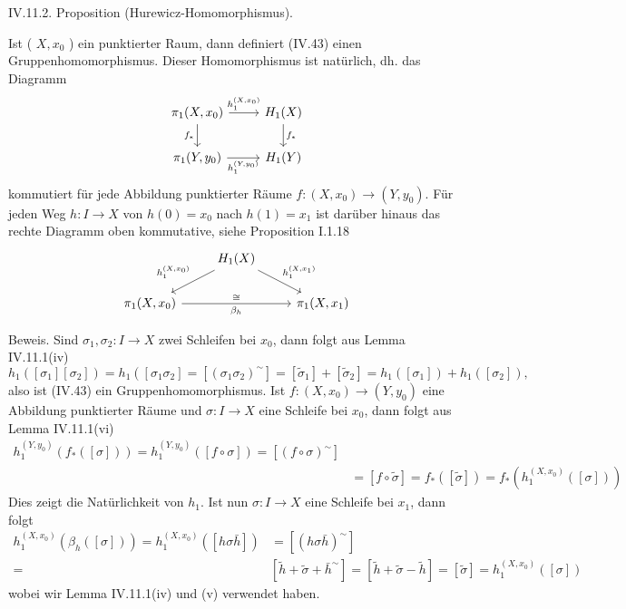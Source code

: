 \documentclass[10pt, letterpaper]{article}
\begin{document}
IV.11.2. Proposition (Hurewicz-Homomorphismus). 

Ist ( $X, x_0$ ) ein punktierter Raum, dann definiert (IV.43) einen Gruppenhomomorphismus. Dieser Homomorphismus ist natürlich, dh. das Diagramm
\[
\begin{tikzcd}
\pi_1(X, x_0) \arrow[r, "h_1^{(X,x_0)}"] \arrow[d, "f_*"'] & H_1(X) \arrow[d, "f_*"] \\
\pi_1(Y, y_0) \arrow[r, "h_1^{(Y,y_0)}"'] & H_1(Y)
\end{tikzcd}
\]
kommutiert für jede Abbildung punktierter Räume $f:\left(X, x_0\right) \rightarrow\left(Y, y_0\right)$. Für jeden Weg $h: I \rightarrow X$ von $h(0)=x_0$ nach $h(1)=x_1$ ist darüber hinaus das rechte Diagramm oben kommutative, siehe Proposition I.1.18
\[
\begin{tikzcd}
  & H_1(X) \arrow[dl, "h_1^{(X,x_0)}"'] \arrow[dr, "h_1^{(X,x_1)}"] \\
  \pi_1(X, x_0) \arrow[rr, "\beta_h"', "\cong"{above}] & & \pi_1(X, x_1)
\end{tikzcd}
\]

Beweis. Sind $\sigma_1, \sigma_2: I \rightarrow X$ zwei Schleifen bei $x_0$, dann folgt aus Lemma IV.11.1(iv)
$$
h_1\left(\left[\sigma_1\right]\left[\sigma_2\right]\right)=h_1\left(\left[\sigma_1 \sigma_2\right]=\left[\left(\sigma_1 \sigma_2\right)^{\sim}\right]=\left[\tilde{\sigma}_1\right]+\left[\tilde{\sigma}_2\right]=h_1\left(\left[\sigma_1\right]\right)+h_1\left(\left[\sigma_2\right]\right),\right.
$$
also ist (IV.43) ein Gruppenhomomorphismus. Ist $f:\left(X, x_0\right) \rightarrow\left(Y, y_0\right)$ eine Abbildung punktierter Räume und $\sigma: I \rightarrow X$ eine Schleife bei $x_0$, dann folgt aus Lemma IV.11.1(vi)
$$
\begin{aligned}
h_1^{\left(Y, y_0\right)}\left(f_*([\sigma])\right)=h_1^{\left(Y, y_0\right)}([f \circ \sigma])=\left[(f \circ \sigma)^{\sim}\right] & \\
& =[f \circ \tilde{\sigma}]=f_*([\tilde{\sigma}])=f_*\left(h_1^{\left(X, x_0\right)}([\sigma])\right)
\end{aligned}
$$
Dies zeigt die Natürlichkeit von $h_1$. Ist nun $\sigma: I \rightarrow X$ eine Schleife bei $x_1$, dann folgt
$$
\begin{aligned}
h_1^{\left(X, x_0\right)}\left(\beta_h([\sigma])\right)=h_1^{\left(X, x_0\right)}([h \sigma \bar{h}]) & =\left[(h \sigma \bar{h})^{\sim}\right] \\
= & {\left[\tilde{h}+\tilde{\sigma}+\bar{h}^{\sim}\right]=[\tilde{h}+\tilde{\sigma}-\tilde{h}]=[\tilde{\sigma}]=h_1^{\left(X, x_0\right)}([\sigma]) }
\end{aligned}
$$
wobei wir Lemma IV.11.1(iv) und (v) verwendet haben.
\end{document}
